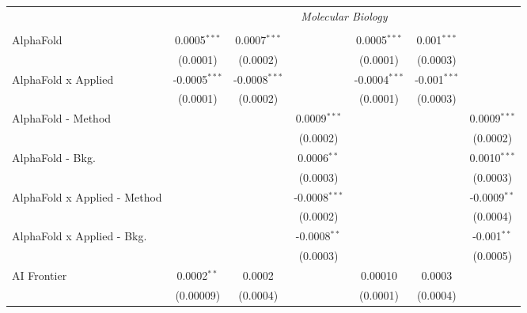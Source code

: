 \begin{tabular}{lcccccc}
 & \multicolumn{6}{c}{\textit{Molecular Biology}} \\ \\
   AlphaFold                      & 0.0005$^{***}$  & 0.0007$^{***}$  &                 & 0.0005$^{***}$  & 0.001$^{***}$  &   \\   
                                  & (0.0001)        & (0.0002)        &                 & (0.0001)        & (0.0003)       &   \\   
   AlphaFold x Applied            & -0.0005$^{***}$ & -0.0008$^{***}$ &                 & -0.0004$^{***}$ & -0.001$^{***}$ &   \\   
                                  & (0.0001)        & (0.0002)        &                 & (0.0001)        & (0.0003)       &   \\   
   AlphaFold - Method             &                 &                 & 0.0009$^{***}$  &                 &                & 0.0009$^{***}$\\   
                                  &                 &                 & (0.0002)        &                 &                & (0.0002)\\   
   AlphaFold - Bkg.               &                 &                 & 0.0006$^{**}$   &                 &                & 0.0010$^{***}$\\   
                                  &                 &                 & (0.0003)        &                 &                & (0.0003)\\   
   AlphaFold x Applied - Method   &                 &                 & -0.0008$^{***}$ &                 &                & -0.0009$^{**}$\\   
                                  &                 &                 & (0.0002)        &                 &                & (0.0004)\\   
   AlphaFold x Applied - Bkg.     &                 &                 & -0.0008$^{**}$  &                 &                & -0.001$^{**}$\\   
                                  &                 &                 & (0.0003)        &                 &                & (0.0005)\\   
   AI Frontier                    & 0.0002$^{**}$   & 0.0002          &                 & 0.00010         & 0.0003         &   \\   
                                  & (0.00009)       & (0.0004)        &                 & (0.0001)        & (0.0004)       &   \\   

\end{tabular}
